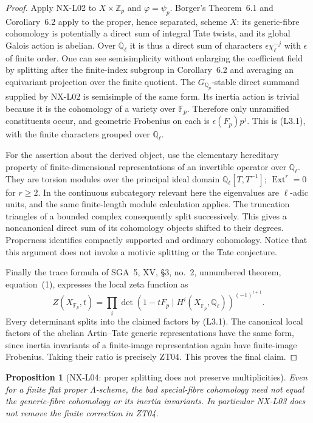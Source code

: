 \documentclass[11pt]{article}
\newtheorem{proposition}[theorem]{Proposition}
\theoremstyle{remark}
\begin{document}
\begin{proof}
Apply NX-L02 to $X\times\mathbb Z_p$ and $\varphi=\psi_p$.
Borger's Theorem~6.1 and Corollary~6.2 apply to the proper, hence
separated, scheme $X$: its generic-fibre cohomology is potentially
a direct sum of integral Tate twists, and its global Galois action
is abelian.  Over $\overline{\mathbb Q}_\ell$ it is thus a direct
sum of characters $\epsilon\chi_\ell^{-j}$ with $\epsilon$ of
finite order.  One can see semisimplicity without enlarging the
coefficient field by splitting after the finite-index subgroup in
Corollary~6.2 and averaging an equivariant projection over the finite
quotient.  The $G_{\mathbb Q_p}$-stable direct summand supplied by
NX-L02 is semisimple of the same form.  Its inertia action is trivial
because it is the cohomology of a variety over $\mathbb F_p$.
Therefore only unramified constituents occur, and geometric
Frobenius on each is $\epsilon(F_p)p^j$.  This is (L3.1), with the
finite characters grouped over $\mathbb Q_\ell$.

For the assertion about the derived object, use the elementary
hereditary property of finite-dimensional representations of an
invertible operator over $\mathbb Q_\ell$.  They are torsion modules
over the principal ideal domain $\mathbb Q_\ell[T,T^{-1}]$;
$\operatorname{Ext}^r=0$ for $r\geq2$.  In the continuous subcategory
relevant here the eigenvalues are $\ell$-adic units, and the same
finite-length module calculation applies.  The truncation triangles
of a bounded complex consequently split successively.  This gives
a noncanonical direct sum of its cohomology objects shifted to their
degrees.  Properness identifies compactly supported and ordinary
cohomology.  Notice that this argument does not invoke a motivic
splitting or the Tate conjecture.

Finally the trace formula of SGA~5, XV, \S3, no.~2, unnumbered theorem,
equation~(1), expresses the local zeta function as
\[
 Z(X_{\mathbb F_p},t)=
 \prod_i\det(1-tF_p\mid H^i(X_{\overline{\mathbb F}_p},\mathbb Q_\ell))^{(-1)^{i+1}}.
\]
Every determinant splits into the claimed factors by (L3.1).  The
canonical local factors of the abelian Artin--Tate generic
representations have the same form, since inertia invariants of a
finite-image representation again have finite-image Frobenius.
Taking their ratio is precisely ZT04.  This proves the final claim.
\end{proof}

\begin{proposition}[NX-L04: proper splitting does not preserve multiplicities]
\label{NX-L04}
Even for a finite flat proper $\Lambda$-scheme, the bad special-fibre
cohomology need not equal the generic-fibre cohomology or its inertia
invariants.  In particular NX-L03 does not remove the finite
correction in ZT04.
\end{proposition}
\end{document}

